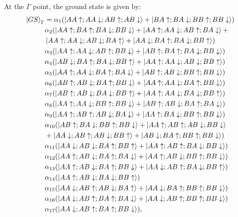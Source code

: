 \documentclass[prb,aps,amssymb,twocolumn,notitlepage]{revtex4-2}
\begin{document}
At the $\Gamma$ point, the ground state is given by:
\begin{align}
\ket{GS}_{\Gamma}&=\alpha_{1}(\ket{AA\uparrow;AA\downarrow;AB\uparrow;AB\downarrow}+\ket{BA\uparrow;BA\downarrow;BB\uparrow;BB\downarrow}) \\
&\alpha_{2}(\ket{AA\uparrow;BA\uparrow;BA\downarrow;BB\downarrow}+\ket{AA\uparrow;AA\downarrow;AB\uparrow;BA\downarrow}+\nonumber \\& \ket{AA\uparrow;AA\downarrow;AB\downarrow;BA\uparrow}+\ket{AA\downarrow;BA\uparrow;BA\downarrow;BB\uparrow}) \nonumber \\
&\alpha_{3}(\ket{AA\uparrow;AA\downarrow;AB\uparrow;BB\downarrow}+\ket{AB\uparrow;BA\uparrow;BA\downarrow;BB\downarrow}) \nonumber \\
&\alpha_{4}(\ket{AB\downarrow;BA\uparrow;BA\downarrow;BB\uparrow}+\ket{AA\uparrow;AA\downarrow;AB\downarrow;BB\uparrow}) \nonumber \\
&\alpha_{5}(\ket{AA\uparrow;AA\downarrow;BA\uparrow;BA\downarrow}+\ket{AB\uparrow;AB\downarrow;BB\uparrow;BB\downarrow}) \nonumber \\
&\alpha_{6}(\ket{AB\uparrow;AB\downarrow;BA\uparrow;BB\downarrow}+\ket{AA\uparrow;AA\downarrow;BA\uparrow;BB\downarrow}) \nonumber \\
&\alpha_{7}(\ket{AB\uparrow;AB\downarrow;BA\downarrow;BB\uparrow}+\ket{AA\uparrow;AA\downarrow;BA\downarrow;BB\uparrow}) \nonumber \\
&\alpha_{8}(\ket{AA\uparrow;AA\downarrow;BB\uparrow;BB\downarrow}+\ket{AB\uparrow;AB\downarrow;BA\uparrow;BA\downarrow}) \nonumber \\
&\alpha_{9}(\ket{AA\uparrow;AB\uparrow;AB\downarrow;BA\downarrow}+\ket{AA\uparrow;BA\downarrow;BB\uparrow;BB\downarrow}) \nonumber \\
&\alpha_{10}(\ket{AB\uparrow;BA\downarrow;BB\uparrow;BB\downarrow}+\ket{AA\uparrow;AB\uparrow;AB\downarrow;BB\downarrow}\nonumber \\&+\ket{AA\downarrow;AB\uparrow;AB\downarrow;BB\uparrow}+\ket{AB\downarrow;BA\uparrow;BB\uparrow;BB\downarrow}) \nonumber \\
&\alpha_{11}(\ket{AA\downarrow;AB\downarrow;BA\uparrow;BB\uparrow}+\ket{AA\uparrow;AB\uparrow;BA\downarrow;BB\downarrow}) \nonumber \\
&\alpha_{12}(\ket{AA\uparrow;AB\downarrow;BA\uparrow;BA\downarrow}+\ket{AA\uparrow;AB\downarrow;BB\uparrow;BB\downarrow}) \nonumber \\
&\alpha_{13}(\ket{AA\uparrow;AB\downarrow;BA\uparrow;BB\downarrow}+\ket{AA\downarrow;AB\uparrow;BA\downarrow;BB\uparrow}) \nonumber \\
&\alpha_{14}(\ket{AA\uparrow;AB\downarrow;BA\downarrow;BB\uparrow}) \nonumber \\
&\alpha_{15}(\ket{AA\downarrow;AB\uparrow;AB\downarrow;BA\uparrow}+\ket{AA\downarrow;BA\uparrow;BB\uparrow;BB\downarrow}) \nonumber \\
&\alpha_{16}(\ket{AA\downarrow;AB\uparrow;BA\uparrow;BA\downarrow}+\ket{AA\downarrow;AB\uparrow;BB\uparrow;BB\downarrow}) \nonumber \\
&\alpha_{17}(\ket{AA\downarrow;AB\uparrow;BA\uparrow;BB\downarrow}), \nonumber
\end{align}
\end{document}
